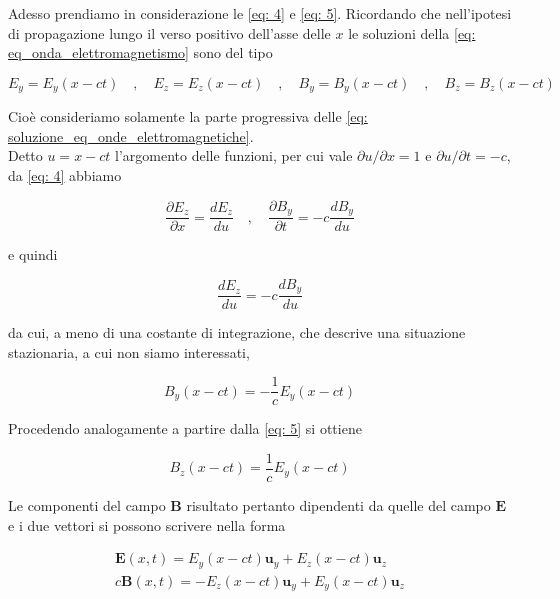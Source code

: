Adesso prendiamo in considerazione le \eqref{eq: 4} e \eqref{eq: 5}. Ricordando che nell'ipotesi di propagazione lungo il verso positivo dell'asse delle $x$ le soluzioni della \ref{eq: eq_onda_elettromagnetismo} sono del tipo 

\begin{equation*}
    E_y = E_y(x - ct) \quad , \quad E_z = E_z(x - ct) \quad , \quad B_y = B_y(x - ct) \quad , \quad B_z = B_z(x - ct)
\end{equation*}

Cioè consideriamo solamente la parte progressiva delle \ref{eq: soluzione_eq_onde_elettromagnetiche}. \\

Detto $u = x - ct$ l'argomento delle funzioni, per cui vale $\partial u/ \partial x = 1$ e $\partial u/\partial t = -c$, da \eqref{eq: 4} abbiamo 

\begin{equation}
    \frac{\partial E_z}{\partial x} = \frac{d E_z}{du} \quad , \quad \frac{\partial B_y}{\partial t} = - c \frac{d B_y}{du}
\end{equation}

e quindi 

\begin{equation}
    \frac{d E_z}{du} = - c \frac{d B_y}{du}
\end{equation}

da cui, a meno di una costante di integrazione, che descrive una situazione stazionaria, a cui non siamo interessati,

\begin{equation}
    B_y(x - ct) = - \frac{1}{c} E_y(x - ct) 
\end{equation}

Procedendo analogamente a partire dalla \eqref{eq: 5} si ottiene 

\begin{equation}
    B_z (x - ct) = \frac{1}{c} E_y(x - ct)
\end{equation}

Le componenti del campo $\mathbf{B}$ risultato pertanto dipendenti da quelle del campo $\mathbf{E}$ e i due vettori si possono scrivere nella forma 

\begin{tcolorbox}[colback=yellow!10!white, colframe=orange!70!black, boxrule=0.8pt]
\begin{align}
    \mathbf{E}(x,t) = E_y(x - ct) \mathbf{u}_y + E_z(x - ct)\mathbf{u}_z\\
    c \mathbf{B}(x,t) = - E_z(x - ct) \mathbf{u}_y + E_y(x - ct) \mathbf{u}_z
\end{align}
\end{tcolorbox}

